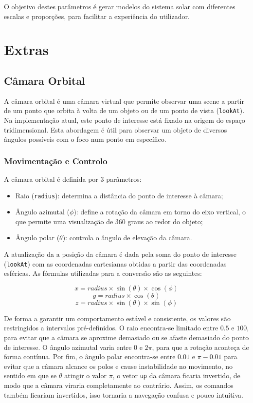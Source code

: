 \documentclass[12pt, a4paper]{article}
\begin{document}
O objetivo destes parâmetros é gerar modelos do sistema solar com diferentes escalas e
proporções, para facilitar a experiência do utilizador.

\section{Extras}

\subsection{Câmara Orbital}

A câmara orbital é uma câmara virtual que permite observar uma scene a partir de um ponto que
orbita à volta de um objeto ou de um ponto de vista (\texttt{lookAt}). Na implementação atual, este
ponto de interesse está fixado na origem do espaço tridimensional. Esta abordagem é útil para
observar um objeto de diversos ângulos possíveis com o foco num ponto em específico.

\subsubsection{Movimentação e Controlo}

A câmara orbital é definida por 3 parâmetros:
\begin{itemize}
    \item Raio (\texttt{radius}): determina a distância do ponto de interesse à câmara;
    \item Ângulo azimutal ($\phi$): define a rotação da câmara em torno do eixo vertical,
    o que permite uma visualização de 360 graus ao redor do objeto;
    \item Ângulo polar ($\theta$): controla o ângulo de elevação da câmara.
\end{itemize}

A atualização da a posição da câmara é dada pela soma do ponto de interesse (\texttt{lookAt}) com
as coordenadas cartesianas obtidas a partir das coordenadas esféricas. As fórmulas utilizadas para
a conversão são as seguintes:

$$x = radius \times \sin(\theta) \times \cos(\phi)$$
$$y = radius \times \cos(\theta)$$
$$z = radius \times \sin(\theta) \times \sin(\phi)$$

De forma a garantir um comportamento estável e consistente, os valores são restringidos a
intervalos pré-definidos. O raio encontra-se limitado entre $0.5$ e $100$, para evitar que a câmara
se aproxime demasiado ou se afaste demasiado do ponto de interesse. O ângulo azimutal varia entre
$0$ e $2\pi$, para que a rotação aconteça de forma contínua. Por fim, o ângulo polar encontra-se
entre $0.01$ e $\pi - 0.01$ para evitar que a câmara alcance os polos e cause instabilidade no
movimento, no sentido em que se $\theta$ atingir o valor $\pi$, o vetor \texttt{up} da câmara
ficaria invertido, de modo que a câmara viraria completamente ao contrário. Assim, os comandos
também ficariam invertidos, isso tornaria a navegação confusa e pouco intuitiva.
\end{document}
